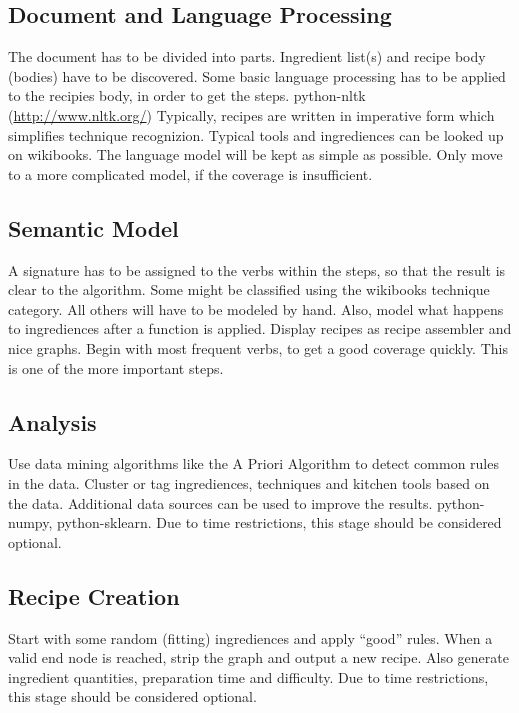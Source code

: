\documentclass[a4paper,10pt]{scrartcl}
\begin{document}
\subsection{Document and Language Processing}
\paf The document has to be divided into parts. Ingredient list(s) and recipe body (bodies) have to be 
discovered. Some basic language processing has to be applied to the recipies body, in order to get the steps.
\lib python-nltk (\url{http://www.nltk.org/})
\tm Typically, recipes are written in imperative form which simplifies technique recognizion. Typical tools
and ingrediences can be looked up on wikibooks. The language model will be kept as simple as possible. 
Only move to a more complicated model, if the coverage is insufficient.

\subsection{Semantic Model}\label{sem}
\paf A signature has to be assigned to the verbs within the steps, so that the result is clear to the
algorithm. Some might be classified using the wikibooks technique category. All others will have to be
modeled by hand. Also, model what happens to ingrediences after a function is applied.
Display recipes as recipe assembler and nice graphs.
\tm Begin with most frequent verbs, to get a good coverage quickly. This is one of the more important steps.

\subsection{Analysis}\label{ana}
\paf Use data mining algorithms like the A Priori Algorithm to detect common rules in the data. Cluster or tag
ingrediences, techniques and kitchen tools based on the data. Additional data sources can be used to improve the results.
\lib python-numpy, python-sklearn. 
\tm Due to time restrictions, this stage should be considered optional.

\subsection{Recipe Creation}\label{cre}
\paf Start with some random (fitting) ingrediences and apply ``good'' rules. When a valid end node is 
reached, strip the graph and output a new recipe. Also generate ingredient quantities,
preparation time and difficulty.
\tm Due to time restrictions, this stage should be considered optional.
\end{document}
